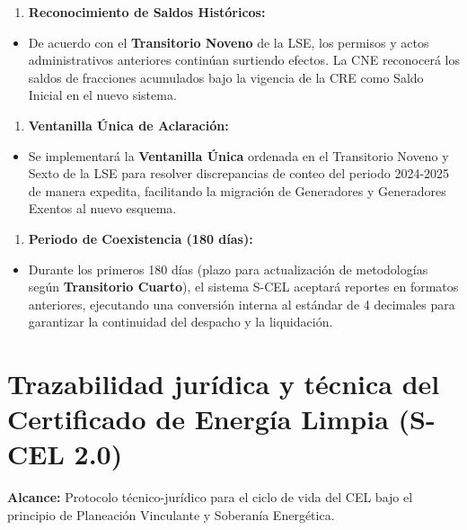 \documentclass{cel}
\begin{document}
\begin{enumerate}
\item \textbf{Reconocimiento de Saldos Históricos:}

\end{enumerate}
\begin{itemize}
\item De acuerdo con el \textbf{Transitorio Noveno} de la LSE, los permisos y actos administrativos anteriores continúan surtiendo efectos. La CNE reconocerá los saldos de fracciones acumulados bajo la vigencia de la CRE como \textquotedbl{}Saldo Inicial\textquotedbl{} en el nuevo sistema.
\end{itemize}
\begin{enumerate}
\item \textbf{Ventanilla Única de Aclaración:}

\end{enumerate}
\begin{itemize}
\item Se implementará la \textbf{Ventanilla Única} ordenada en el Transitorio Noveno y Sexto de la LSE para resolver discrepancias de conteo del periodo 2024-2025 de manera expedita, facilitando la migración de Generadores y Generadores Exentos al nuevo esquema.
\end{itemize}
\begin{enumerate}
\item \textbf{Periodo de Coexistencia (180 días):}

\end{enumerate}
\begin{itemize}
\item Durante los primeros 180 días (plazo para actualización de metodologías según \textbf{Transitorio Cuarto}), el sistema S-CEL aceptará reportes en formatos anteriores, ejecutando una conversión interna al estándar de 4 decimales para garantizar la continuidad del despacho y la liquidación.

\end{itemize}
{}
\section*{Trazabilidad jurídica y técnica del Certificado de Energía Limpia (S-CEL 2.0)}
\nopagebreak

\textbf{Alcance:} Protocolo técnico-jurídico para el ciclo de vida del CEL bajo el principio de Planeación Vinculante y Soberanía Energética.
\end{document}
